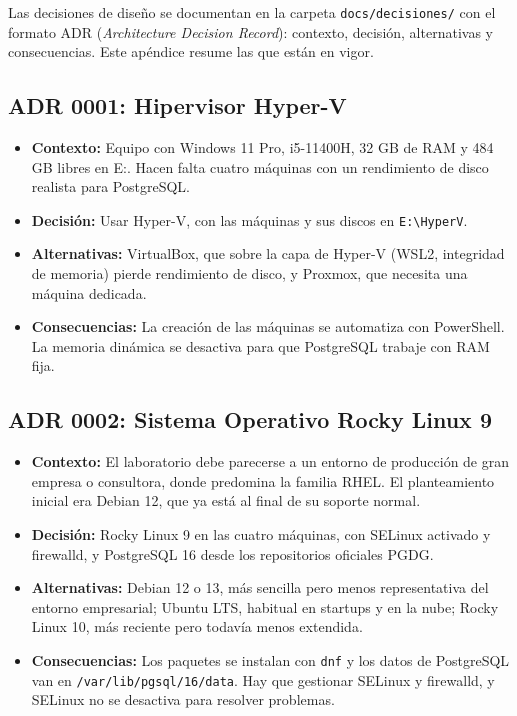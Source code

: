 \documentclass[11pt, a4paper, titlepage]{article}
\newcommand{\cod}[1]{\texttt{#1}}
\begin{document}
Las decisiones de diseño se documentan en la carpeta \cod{docs/decisiones/} con el formato ADR (\textit{Architecture Decision Record}): contexto, decisión, alternativas y consecuencias. Este apéndice resume las que están en vigor.

\subsection{ADR 0001: Hipervisor Hyper-V}

\begin{itemize}
    \item \textbf{Contexto:} Equipo con Windows 11 Pro, i5-11400H, 32 GB de RAM y 484 GB libres en E:. Hacen falta cuatro máquinas con un rendimiento de disco realista para PostgreSQL.
    \item \textbf{Decisión:} Usar Hyper-V, con las máquinas y sus discos en \cod{E:\textbackslash HyperV}.
    \item \textbf{Alternativas:} VirtualBox, que sobre la capa de Hyper-V (WSL2, integridad de memoria) pierde rendimiento de disco, y Proxmox, que necesita una máquina dedicada.
    \item \textbf{Consecuencias:} La creación de las máquinas se automatiza con PowerShell. La memoria dinámica se desactiva para que PostgreSQL trabaje con RAM fija.
\end{itemize}

\subsection{ADR 0002: Sistema Operativo Rocky Linux 9}

\begin{itemize}
    \item \textbf{Contexto:} El laboratorio debe parecerse a un entorno de producción de gran empresa o consultora, donde predomina la familia RHEL. El planteamiento inicial era Debian 12, que ya está al final de su soporte normal.
    \item \textbf{Decisión:} Rocky Linux 9 en las cuatro máquinas, con SELinux activado y firewalld, y PostgreSQL 16 desde los repositorios oficiales PGDG.
    \item \textbf{Alternativas:} Debian 12 o 13, más sencilla pero menos representativa del entorno empresarial; Ubuntu LTS, habitual en startups y en la nube; Rocky Linux 10, más reciente pero todavía menos extendida.
    \item \textbf{Consecuencias:} Los paquetes se instalan con \cod{dnf} y los datos de PostgreSQL van en \cod{/var/lib/pgsql/16/data}. Hay que gestionar SELinux y firewalld, y SELinux no se desactiva para resolver problemas.
\end{itemize}
\end{document}
